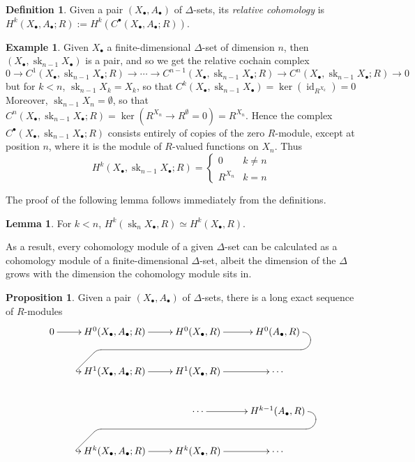 \documentclass{tufte-handout}
\DeclareMathOperator{\id}{id}
\DeclareMathOperator{\sk}{sk}
\theoremstyle{definition}
\newtheorem{prop}{Proposition}
\newtheorem{lemma}{Lemma}
\newtheorem{definition}{Definition}
\newtheorem{example}{Example}
\begin{document}
\begin{definition}
Given a pair $(X_\bullet,A_\bullet)$ of $\Delta$-sets, its \emph{relative cohomology} is
$H^k(X_\bullet,A_\bullet;R) := H^k(C^\bullet(X_\bullet,A_\bullet;R))$.
\end{definition}

\begin{example}\label{eg:dim_minus_one_skeleton_rel_cochains}
Given $X_\bullet$ a finite-dimensional $\Delta$-set of dimension $n$, then 
$(X_\bullet,\sk_{n-1}X_\bullet)$ is a pair, and so we get the relative cochain complex
\[
	0\to C^1(X_\bullet,\sk_{n-1}X_\bullet;R) \to \cdots \to C^{n-1}(X_\bullet,\sk_{n-1}X_\bullet;R) \to C^n(X_\bullet,\sk_{n-1}X_\bullet;R) \to 0
\]
but for $k < n$, $\sk_{n-1}X_k = X_k$, so that $C^k(X_\bullet,\sk_{n-1}X_\bullet) = \ker(\id_{R^{X_k}}) = 0$
Moreover, $\sk_{n-1}X_n = \emptyset$, so that $C^n(X_\bullet,\sk_{n-1}X_\bullet;R) = \ker(R^{X_n} \to R^\emptyset=0) = R^{X_n}$. Hence the complex $C^\bullet(X_\bullet,\sk_{n-1}X_\bullet;R)$ 
consists entirely of copies of the zero $R$-module, except at position $n$, where it is the module of 
$R$-valued functions on $X_n$. Thus 
\[
	H^k(X_\bullet,\sk_{n-1}X_\bullet;R) = \begin{cases}
						0 & k\neq n\\
						R^{X_n} & k=n
						\end{cases}
\]
\end{example}

The proof of the following lemma follows immediately from the definitions.

\begin{lemma}
For $k < n$, $H^k(\sk_nX_\bullet,R) \simeq H^k(X_\bullet,R)$.
\end{lemma}

As a result, every cohomology module of a given $\Delta$-set can be calculated as a cohomology 
module of a finite-dimensional $\Delta$-set, albeit the dimension of the $\Delta$ grows with the 
dimension the cohomology module sits in.

\begin{prop}
Given a pair $(X_\bullet,A_\bullet)$ of $\Delta$-sets, there is a long exact sequence of $R$-modules
\[
\xymatrix{%
    0 \ar[r] & H^0(X_\bullet,A_\bullet;R) \ar[r] & H^0(X_\bullet,R) \ar[r] & H^0(A_\bullet,R) \ar@{->} `r/8pt[d] `/10pt[l] `^dl[ll] `^r/1pt[dll] [dll] \\
             & H^1(X_\bullet,A_\bullet;R) \ar[r] & H^1(X_\bullet,R)\ar[r] &\cdots \\
                &&\cdots \ar[r] & H^{k-1}(A_\bullet,R)
                \ar@{->} `r/8pt[d] `/10pt[l] `^dl[ll] `^r/1pt[dll] [dll] \\
             & H^k(X_\bullet,A_\bullet;R) \ar[r] & H^k(X_\bullet,R) \ar[r] & \cdots 
}
\]
\end{prop}
\end{document}
